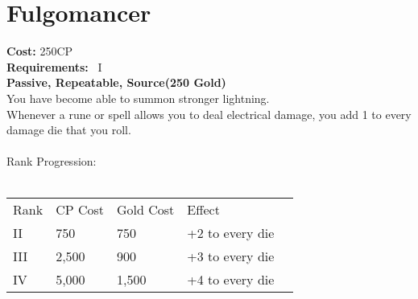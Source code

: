 \section{Fulgomancer}\label{perk:fulgomancer}
\textbf{Cost:} 250CP\\
\textbf{Requirements:}~ I\\
\textbf{Passive, Repeatable, Source(250 Gold)}\\
You have become able to summon stronger lightning.\\
Whenever a rune or spell allows you to deal electrical damage, you add 1 to every damage die that you roll.\\
\\
Rank Progression:\\
\\
\begin{tabular}{l | l | l | l | l}
    Rank & CP Cost & Gold Cost &  Effect\\
    II & 750 & 750 & +2 to every die\\
    III & 2,500 & 900 & +3 to every die\\
    IV & 5,000 & 1,500 & +4 to every die\\
\end{tabular}
